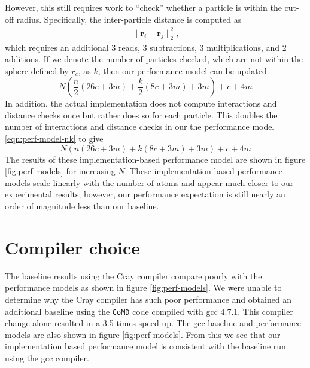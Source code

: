 \documentclass[12pt]{article}
\begin{document}
 However, this still requires work to ``check'' whether a particle 
is within the cut-off radius. Specifically, the inter-particle distance is computed as
\begin{align*}
    \| \bm{r}_i - \bm{r}_j\|_2^2,
\end{align*}
which requires an additional 3 reads, 3 subtractions, 3 multiplications, and 2 additions.
If we denote the number of particles checked, which are not within the sphere defined 
by $r_c$, as $k$, then our performance model can be updated
\begin{equation}
  N \left(\frac{n}{2} \left(26 c + 3 m\right)+\frac{k}{2} \left(8 c + 3 m\right) + 3 m\right) + c + 4 m
  \label{eqn:perf-model-nk}
\end{equation}
In addition, the actual implementation does not compute interactions
and distance checks once but rather does so for each particle. This
doubles the number of interactions and distance checks in our the
performance model \ref{eqn:perf-model-nk} to give
\begin{equation}
  N \left(n \left(26 c + 3 m\right)+k \left(8 c + 3 m\right) + 3 m\right) + c + 4 m
  \label{eqn:perf-model-2n2k}
\end{equation}
The results of these implementation-based performance model are shown
in figure \ref{fig:perf-models} for increasing $N$. These
implementation-based performance models scale linearly with the number
of atoms and appear much closer to our experimental results; however,
our performance expectation is still nearly an order of magnitude less
than our baseline.

\section{Compiler choice}
The baseline results using the Cray compiler compare poorly with the
performance models as shown in figure \ref{fig:perf-models}. We were
unable to determine why the Cray compiler has such poor performance
and obtained an additional baseline using the \texttt{CoMD} code
compiled with gcc 4.7.1. This compiler change alone resulted in a 3.5
times speed-up. The gcc baseline and performance models are also shown
in figure \ref{fig:perf-models}. From this we see that our
implementation based performance model is consistent with the baseline
run using the gcc compiler.

\end{document}
